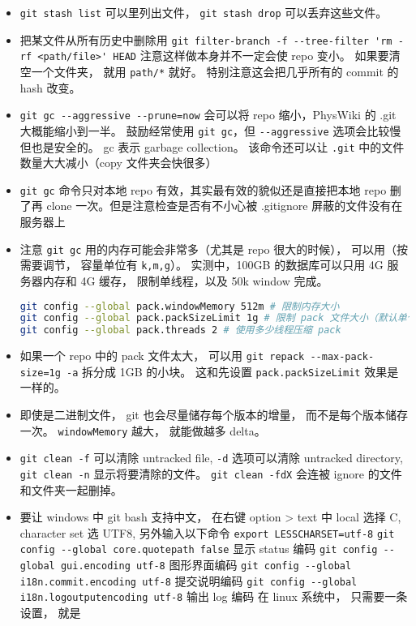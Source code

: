 \begin{itemize}
\item \verb|git stash list| 可以里列出文件， \verb|git stash drop| 可以丢弃这些文件。
\item 把某文件从所有历史中删除用 \verb|git filter-branch -f --tree-filter 'rm -rf <path/file>' HEAD| 注意这样做本身并不一定会使 repo 变小。 如果要清空一个文件夹， 就用 \verb|path/*| 就好。 特别注意这会把几乎所有的 commit 的 hash 改变。
\item \verb|git gc --aggressive --prune=now| 会可以将 repo 缩小，PhysWiki 的 .git 大概能缩小到一半。 鼓励经常使用 \verb|git gc|，但 \verb|--aggressive| 选项会比较慢但也是安全的。 gc 表示 garbage collection。 该命令还可以让 \verb|.git| 中的文件数量大大减小（copy 文件夹会快很多）
\item \verb|git gc| 命令只对本地 repo 有效，其实最有效的貌似还是直接把本地 repo 删了再 clone 一次。但是注意检查是否有不小心被 .gitignore 屏蔽的文件没有在服务器上
\item 注意 \verb|git gc| 用的内存可能会非常多（尤其是 repo 很大的时候）， 可以用（按需要调节， 容量单位有 \verb|k,m,g|）。 实测中，100GB 的数据库可以只用 4G 服务器内存和 4G 缓存， 限制单线程，以及 50k window 完成。
\begin{lstlisting}[language=bash]
git config --global pack.windowMemory 512m # 限制内存大小
git config --global pack.packSizeLimit 1g # 限制 pack 文件大小（默认单个文件）
git config --global pack.threads 2 # 使用多少线程压缩 pack
\end{lstlisting}
\item 如果一个 repo 中的 pack 文件太大， 可以用 \verb|git repack --max-pack-size=1g -a| 拆分成 1GB 的小块。 这和先设置 \verb|pack.packSizeLimit| 效果是一样的。
\item 即使是二进制文件， git 也会尽量储存每个版本的增量， 而不是每个版本储存一次。 \verb|windowMemory| 越大， 就能做越多 delta。
\item \verb|git clean -f| 可以清除 untracked file, \verb|-d| 选项可以清除 untracked directory,  \verb|git clean -n| 显示将要清除的文件。 \verb|git clean -fdX| 会连被 ignore 的文件和文件夹一起删掉。
\item 要让 windows 中 git bash 支持中文， 在右键 option > text 中 local 选择 C, character set 选 UTF8, 另外输入以下命令
\verb|export LESSCHARSET=utf-8|
\verb|git config --global core.quotepath false|     显示 status 编码
\verb|git config --global gui.encoding utf-8|    图形界面编码
\verb|git config --global i18n.commit.encoding utf-8|   提交说明编码
\verb|git config --global i18n.logoutputencoding utf-8| 输出 log 编码
在 linux 系统中， 只需要一条设置， 就是

\end{itemize}
